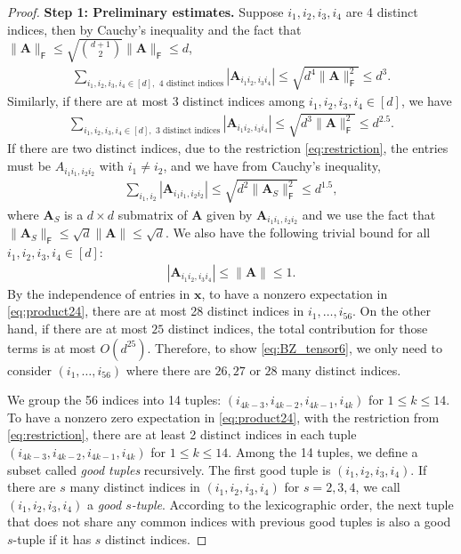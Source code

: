 \documentclass[twoside,11pt]{article}
\def\bA{{\boldsymbol A}}
\def\bx{{\boldsymbol x}}
\newcommand{\1}{\mathbf{1}}
\def\msf{\mathsf}
\begin{document}
\begin{proof}
\textbf{Step 1: Preliminary estimates.} 
Suppose $i_1,i_2,i_3,i_4$ are 4 distinct indices, then by Cauchy's inequality and the fact that $\|\bA\|_{\msf F}\leq \sqrt{\binom{d+1}{2}}\|\bA\|_{\msf F}\leq d$,
\begin{align}\label{eq:4distinct}
    \sum_{i_1,i_2,i_3,i_4\in [d],  \text{  4 distinct indices}}|\bA_{i_1i_2,i_3i_4}|\leq \sqrt{d^4 \|\bA\|_{\msf F}^2}\leq d^3.
\end{align}
Similarly, if there are at most 3 distinct indices among $i_1,i_2,i_3,i_4\in [d]$, we have 
\begin{align}\label{eq:3distinct}
  \sum_{i_1,i_2,i_3,i_4\in [d], \text{ 3 distinct indices}}|\bA_{i_1i_2,i_3i_4}|\leq \sqrt{d^3 \|\bA\|_{\msf F}^2}\leq d^{2.5}. 
\end{align}
If there are two distinct indices, due to the restriction \eqref{eq:restriction}, the entries must be $A_{i_1i_1,i_2i_2}$ with $i_1\not=i_2$, and  we have from Cauchy's inequality,
\begin{align}\label{eq:2distinct}
\sum_{i_1,i_2}|\bA_{i_1i_1,i_2i_2}|\leq \sqrt{d^2\|\bA_S\|_{\msf F}^2}\leq d^{1.5},
\end{align}
where $\bA_S$ is a $d\times d$ submatrix of $\bA$ given by $\bA_{i_1i_1,i_2i_2}$ and we use the fact that  $\|\bA_S\|_{\msf F}\leq \sqrt{d}\|\bA\|\leq \sqrt{d}$. We also have the following trivial bound for all $i_1,i_2,i_3,i_4\in [d]$:
\begin{align}\label{eq:trivial}
    |\bA_{i_1i_2,i_3i_4}|\leq \|\bA\|\leq 1.
\end{align}
By the independence of entries in $\bx$, to have a nonzero expectation in \eqref{eq:product24}, there are at most 28 distinct indices in $i_1,\dots, i_{56}$. On the other hand, if there are at most $25$ distinct indices, the total contribution for those terms is at most $O(d^{25})$. Therefore, to show \eqref{eq:BZ_tensor6}, we only need to consider  $(i_1,\dots,i_{56})$ where there are $26,27$ or $28$ many distinct indices. 


We group the 56 indices into 14 tuples: $(i_{4k-3},i_{4k-2},i_{4k-1},i_{4k})$ for $1\leq k\leq 14$.  To have a nonzero zero expectation in \eqref{eq:product24}, with the restriction  from \eqref{eq:restriction}, there are at least 2 distinct indices in each tuple $(i_{4k-3},i_{4k-2},i_{4k-1},i_{4k})$ for $1\leq k\leq 14$. 
Among the 14 tuples, we define a subset called \textit{good tuples} recursively. The first good tuple is $(i_1,i_2,i_3,i_4)$. If there are $s$ many distinct indices in $(i_1,i_2,i_3,i_4)$ for $s=2,3,4$, we call $(i_1,i_2,i_3,i_4)$ a \textit{good $s$-tuple}.  According to the lexicographic order, the next tuple that does not share any common indices with previous good tuples is also a good $s$-tuple if it has $s$ distinct indices. 


\end{proof}
\end{document}
